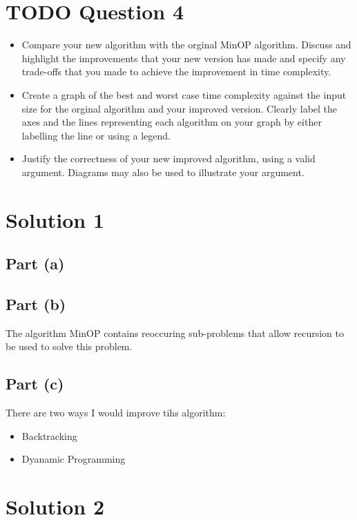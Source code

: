 \documentclass[11pt]{article}
\begin{document}
\section{{\bfseries\sffamily TODO} Question 4}
\label{sec-4}
\begin{itemize}
\item Compare your new algorithm with the orginal MinOP algorithm. Discuss
and highlight the improvements that your new version has made and
specify any trade-offs that you made to achieve the improvement in
time complexity.
\item Create a graph of the best and worst case time complexity against
the input size for the orginal algorithm and your improved
version. Clearly label the axes and the lines representing each
algorithm on your graph by either labelling the line or using a
legend.
\item Justify the correctness of your new improved algorithm, using a
valid argument. Diagrams may also be used to illustrate your
argument.
\end{itemize}


\section{Solution 1}
\label{sec-5}

\subsection{Part (a)}
\label{sec-5-1}

\subsection{Part (b)}
\label{sec-5-2}

The algorithm MinOP contains reoccuring sub-problems that allow
recursion to be used to solve this problem. 

\subsection{Part (c)}
\label{sec-5-3}

There are two ways I would improve tihs algorithm:
\begin{itemize}
\item Backtracking
\item Dyanamic Programming
\end{itemize}


\section{Solution 2}
\label{sec-6}

\end{document}
